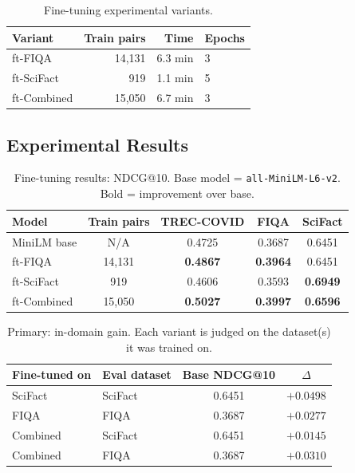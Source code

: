 \documentclass[12pt, a4paper]{article}
\makeatletter
\newcommand{\ndcg}{NDCG@10}
\newcommand{\tc}{TREC-COVID}
\newcommand{\fiqa}{FIQA}
\newcommand{\scifact}{SciFact}
\makeatother
\begin{document}
\begin{table}[h]
\centering
\caption{Fine-tuning experimental variants.}
\label{tab:ft_setup}
\begin{tabular}{lrrl}
\toprule
\textbf{Variant} & \textbf{Train pairs} & \textbf{Time} & \textbf{Epochs} \\
\midrule
ft-\fiqa{}      & 14,131 & 6.3 min & 3 \\
ft-\scifact{}   & 919    & 1.1 min & 5 \\
ft-Combined     & 15,050 & 6.7 min & 3 \\
\bottomrule
\end{tabular}
\end{table}

\subsection{Experimental Results}

\begin{table}[h]
\centering
\caption{Fine-tuning results: \ndcg{}.  Base model = \texttt{all-MiniLM-L6-v2}.
  Bold = improvement over base.}
\label{tab:finetune}
\begin{tabular}{lcccc}
\toprule
\textbf{Model} & \textbf{Train pairs} & \textbf{\tc{}} & \textbf{\fiqa{}} & \textbf{\scifact{}} \\
\midrule
MiniLM base        & N/A    & 0.4725 & 0.3687 & 0.6451 \\
ft-\fiqa{}         & 14,131 & \textbf{0.4867} & \textbf{0.3964} & 0.6451 \\
ft-\scifact{}      & 919    & 0.4606 & 0.3593 & \textbf{0.6949} \\
ft-Combined        & 15,050 & \textbf{0.5027} & \textbf{0.3997} & \textbf{0.6596} \\
\bottomrule
\end{tabular}
\end{table}

\begin{table}[h]
\centering
\caption{Primary: in-domain gain.  Each variant is judged on the
  dataset(s) it was trained on.}
\label{tab:ft_delta_indomain}
\begin{tabular}{llcc}
\toprule
\textbf{Fine-tuned on} & \textbf{Eval dataset} & \textbf{Base \ndcg{}} & \textbf{$\Delta$} \\
\midrule
\scifact{}            & \scifact{}  & 0.6451 & $+0.0498$ \\
\fiqa{}               & \fiqa{}     & 0.3687 & $+0.0277$ \\
Combined              & \scifact{}  & 0.6451 & $+0.0145$ \\
Combined              & \fiqa{}     & 0.3687 & $+0.0310$ \\
\bottomrule
\end{tabular}
\end{table}
\end{document}
